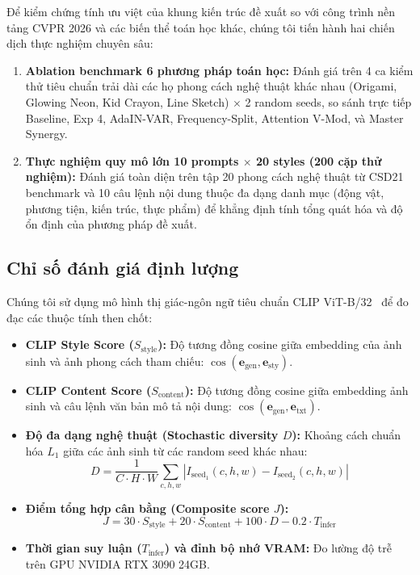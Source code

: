 \documentclass[10pt,twocolumn,letterpaper]{article}
\begin{document}
Để kiểm chứng tính ưu việt của khung kiến trúc đề xuất so với công trình nền tảng CVPR 2026 và các biến thể toán học khác, chúng tôi tiến hành hai chiến dịch thực nghiệm chuyên sâu:
\begin{enumerate}
    \item \textbf{Ablation benchmark 6 phương pháp toán học:} Đánh giá trên 4 ca kiểm thử tiêu chuẩn trải dài các họ phong cách nghệ thuật khác nhau (Origami, Glowing Neon, Kid Crayon, Line Sketch) $\times$ 2 random seeds, so sánh trực tiếp Baseline, Exp 4, AdaIN-VAR, Frequency-Split, Attention V-Mod, và Master Synergy.
    \item \textbf{Thực nghiệm quy mô lớn 10 prompts $\times$ 20 styles (200 cặp thử nghiệm):} Đánh giá toàn diện trên tập 20 phong cách nghệ thuật từ CSD21 benchmark và 10 câu lệnh nội dung thuộc đa dạng danh mục (động vật, phương tiện, kiến trúc, thực phẩm) để khẳng định tính tổng quát hóa và độ ổn định của phương pháp đề xuất.
\end{enumerate}

\subsection{Chỉ số đánh giá định lượng}
Chúng tôi sử dụng mô hình thị giác-ngôn ngữ tiêu chuẩn CLIP ViT-B/32~\cite{radford2021learning} để đo đạc các thuộc tính then chốt:
\begin{itemize}
    \item \textbf{CLIP Style Score ($S_{\text{style}}$):} Độ tương đồng cosine giữa embedding của ảnh sinh và ảnh phong cách tham chiếu: $\cos(\mathbf{e}_{\text{gen}}, \mathbf{e}_{\text{sty}})$.
    \item \textbf{CLIP Content Score ($S_{\text{content}}$):} Độ tương đồng cosine giữa embedding ảnh sinh và câu lệnh văn bản mô tả nội dung: $\cos(\mathbf{e}_{\text{gen}}, \mathbf{e}_{\text{txt}})$.
    \item \textbf{Độ đa dạng nghệ thuật (Stochastic diversity $D$):} Khoảng cách chuẩn hóa $L_1$ giữa các ảnh sinh từ các random seed khác nhau:
    \begin{equation}
    D = \frac{1}{C \cdot H \cdot W} \sum_{c, h, w} |I_{\text{seed}_1}(c, h, w) - I_{\text{seed}_2}(c, h, w)|
    \end{equation}
    \item \textbf{Điểm tổng hợp cân bằng (Composite score $J$):}
    \begin{equation}
    J = 30 \cdot S_{\text{style}} + 20 \cdot S_{\text{content}} + 100 \cdot D - 0.2 \cdot T_{\text{infer}}
    \end{equation}
    \item \textbf{Thời gian suy luận ($T_{\text{infer}}$) và đỉnh bộ nhớ VRAM:} Đo lường độ trễ trên GPU NVIDIA RTX 3090 24GB.
\end{itemize}
\end{document}
